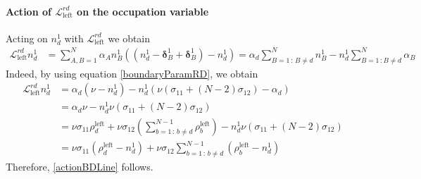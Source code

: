 \documentclass[10pt]{article}
\numberwithin{equation}{section}
\numberwithin{equation}{subsection}
\begin{document}
\paragraph{Action of $\mathcal{L}_{\text{left}}^{rd}$ on the occupation variable}
Acting on $n_{d}^{1}$  with $\mathcal{L}_{\text{left}}^{rd}$ we obtain
\begin{equation}\label{actionBoudaryRD}
	\begin{split}
		\mathcal{L}_{\text{left}}^{rd}n_{d}^{1}&=\sum_{A,B=1}^{N}\alpha_{A}n_{B}^{1}\left((n_{d}^{1}-\bm{\delta}_{B}^{1}+\bm{\delta}_{B}^{1})-n_{d}^{1}\right)=\alpha_{d}\sum_{B=1\,:\,B\neq d}^{N}n_{B}^{1}-n_{d}^{1}\sum_{B=1\,:B\neq d}^{N}\alpha_{B}
	\end{split}
\end{equation}
Indeed, by using equation \eqref{boundaryParamRD}, we obtain 
\begin{align}
			\mathcal{L}_{\text{left}}^{rd}n_{d}^{1}&=
		\alpha_{d}\left(\nu-n_{d}^{1}\right)-n_{d}^{1}\left(\nu(\sigma_{11}+(N-2)\sigma_{12})-\alpha_{d}\right)
		\\&=\alpha_{d}\nu-n_{d}^{1}\nu(\sigma_{11}+(N-2)\sigma_{12})
		\\&=
		\nu\sigma_{11}\rho_{d}^{\text{left}}+\nu\sigma_{12}\left(\sum_{b=1\,:\,b\neq d}^{N-1}\rho_{b}^{\text{left}}\right)-n_{d}^{1}\nu(\sigma_{11}+(N-2)\sigma_{12})
		\\&=
		\nu \sigma_{11} (\rho_{d}^{\text{left}}-n_{d}^{1})+\nu\sigma_{12}\sum_{b=1\,:\,b\neq d}^{N-1}(\rho_{b}^{\text{left}}-n_{d}^{1})
	\end{align}
Therefore, \eqref{actionBDLine} follows.


\end{document}
